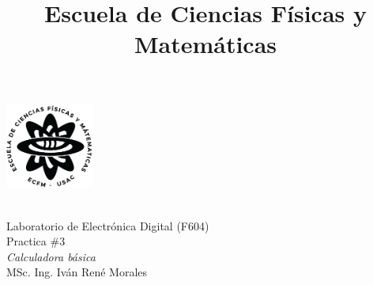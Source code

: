 \documentclass[11pt, letterpaper]{article} %
\title{Escuela de Ciencias Físicas y Matemáticas}
\makeatletter
\let\thetitle\@title
\newcommand{\hoofding}[5]{ %
\begin{flushleft}
\includegraphics[height=2.8cm]{images/logoecfm.png} %
\end{flushleft}
\vspace{-3cm} %
\hspace{4cm} 
\parbox{15cm}{ #1\\#2\\#3\\#4\\#5} %
{\parindent=0pt \hrulefill} 
\vspace{1mm}}
\makeatother
\begin{document}
\setlength{\parindent}{1cm}%

\hoofding {\thetitle}{Laboratorio de Electrónica Digital (F604)}{Practica $\#$3}
{\textit{Calculadora básica}}{MSc. Ing. Iván René Morales}%


%
%
\end{document}
